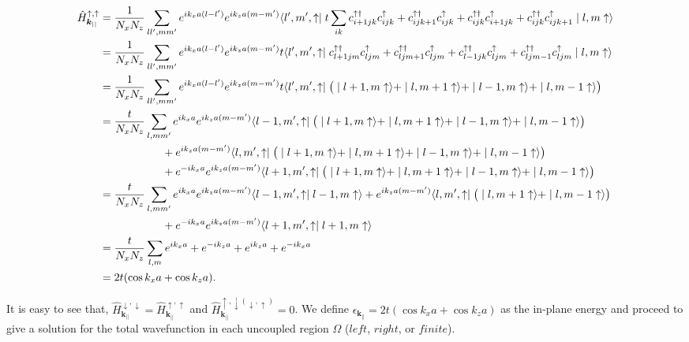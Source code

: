 \documentclass[10pt,prb,showpacs,amssymb,floatfix]{revtex4-1}
\newcommand{\dg}{\dagger}
\newcommand{\dna}{\downarrow}
\newcommand{\nn}{\nonumber}
\newcommand{\para}{\parallel}
\newcommand{\upa}{\uparrow}
\newcommand{\Og}{\Omega}
\newcommand{\h}{\hat}
\begin{document}
\begin{align}
\h H^{\upa,\upa}_{{\bm k}_{||}} &= \frac{1}{N_x N_z} \sum_{ll',mm'} e^{ik_x a(l-l')}e^{ik_z a(m-m')} \langle l',m',\upa \mid t\sum_{ik} c_{i+1jk}^{\upa\dagger}c_{ijk}^{\upa} + c_{ijk+1}^{\upa\dg} c_{ijk}^{\upa} + c_{ijk}^{\upa\dg}c_{i+1jk}^{\upa} +  c_{ijk}^{\upa\dg} c_{ijk+1}^{\upa}   \mid l,m \upa \rangle \nn\\&=  \frac{1}{N_x N_z} \sum_{ll',mm'} e^{ik_x a(l-l')}e^{ik_z a(m-m')} t \langle l',m',\upa \mid  c_{l+1jm}^{\upa\dagger}c_{ljm}^{\upa} + c_{ljm+1}^{\upa\dg} c_{ljm}^{\upa} + c_{l-1jk}^{\upa\dg}c_{ljm}^{\upa} +  c_{ljm-1}^{\upa\dg} c_{ljm}^{\upa}   \mid l,m \upa \rangle \nn\\
&= \frac{1}{N_x N_z} \sum_{ll',mm'} e^{ik_x a(l-l')}e^{ik_z a(m-m')} t  \langle l',m',\upa \mid \big{(} \mid l+1,m \upa \rangle + \mid l,m+1 \upa \rangle + \mid l-1,m \upa \rangle + \mid l,m-1 \upa \rangle\big{)} \nn\\
&=  \frac{t}{N_x N_z} \sum_{l,mm'} e^{ik_x a}e^{ik_z a(m-m')}   \langle l-1,m',\upa \mid \big{(} \mid l+1,m \upa \rangle + \mid l,m+1 \upa \rangle + \mid l-1,m \upa \rangle + \mid l,m-1 \upa \rangle\big{)} \nn\\& ~~~~~~~~~~~~~~~~~+ e^{ik_z a(m-m')}   \langle l,m',\upa \mid \big{(} \mid l+1,m \upa \rangle + \mid l,m+1 \upa \rangle + \mid l-1,m \upa \rangle + \mid l,m-1 \upa \rangle\big{)} \nn\\&  ~~~~~~~~~~~~~~~~~+ e^{-ik_x a}e^{ik_z a(m-m')}   \langle l+1,m',\upa \mid \big{(} \mid l+1,m \upa \rangle + \mid l,m+1 \upa \rangle + \mid l-1,m \upa \rangle + \mid l,m-1 \upa \rangle\big{)} \nn\\
&=\frac{t}{N_x N_z} \sum_{l,mm'} e^{ik_x a}e^{ik_z a(m-m')}   \langle l-1,m',\upa \mid  l-1,m \upa \rangle  + e^{ik_z a(m-m')}   \langle l,m',\upa \mid \big{(}  \mid l,m+1 \upa \rangle  + \mid l,m-1 \upa \rangle\big{)} \nn\\&  ~~~~~~~~~~~~~~~~~+ e^{-ik_x a}e^{ik_z a(m-m')}   \langle l+1,m',\upa \mid l+1,m \upa \rangle \nn\\
&=\frac{t}{N_x N_z} \sum_{l,m} e^{ik_x a}     + e^{-ik_z a} +  e^{ik_z a}  + e^{-ik_x a} \nn\\
&= 2t(\cos k_xa + \cos k_z a).
\end{align}

It is easy to see that, $\h H^{\dna,\dna}_{{\bm k}_{||}} = \h H^{\upa,\upa}_{{\bm k}_{||}}$ and $\h H^{\upa,\dna (\dna,\upa)}_{{\bm k}_{||}} = 0$.
We define $\epsilon_{\bm k_\para} = 2t (\cos k_xa + \cos k_z a)$ as the in-plane energy and proceed to give a solution for the total wavefunction in each uncoupled region $\Og$ ($left$, $right$, or $finite$). 
\end{document}
